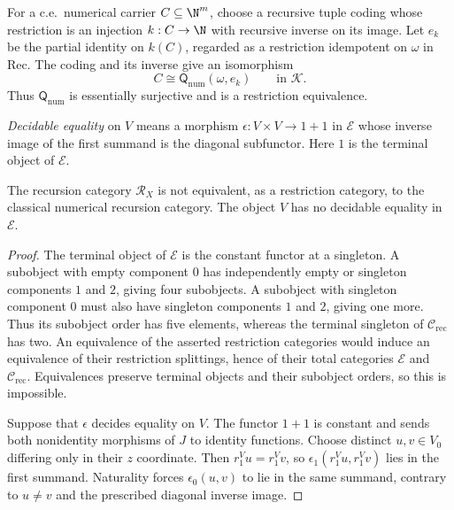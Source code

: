 For a c.e.\ numerical carrier $C\subseteq\N^m$, choose a recursive
tuple coding whose restriction is an injection $k:C\to\N$ with
recursive inverse on its image. Let $e_k$ be the partial identity
on $k(C)$, regarded as a restriction idempotent on $\omega$ in
$\mathrm{Rec}$. The coding and its inverse give an isomorphism
\[
 C\cong\mathsf Q_{\mathrm{num}}(\omega,e_k)
 \qquad\text{in }\mathcal K.
\]
Thus $\mathsf Q_{\mathrm{num}}$ is essentially surjective and is a
restriction equivalence.

\emph{Decidable equality} on $V$ means a morphism
$\epsilon:V\times V\to1+1$ in $\mathcal E$ whose inverse image of
the first summand is the diagonal subfunctor. Here $1$ is the terminal object of $\mathcal E$.

\begin{proposition}\label{prop:fork-distinction}
The recursion category $\mathscr R_X$ is not equivalent, as a
restriction category, to the classical numerical recursion category.
The object $V$ has no decidable equality in $\mathcal E$.
\end{proposition}
\begin{proof}
The terminal object of $\mathcal E$ is the constant functor at a singleton.
A subobject with empty component $0$ has independently empty or
singleton components $1$ and $2$, giving four subobjects. A
subobject with singleton component $0$ must also have singleton
components $1$ and $2$, giving one more. Thus its subobject order has five elements, whereas
the terminal singleton of $\mathcal C_{\mathrm{rec}}$ has two.
An equivalence of the asserted restriction categories would induce
an equivalence of their restriction splittings, hence of their
total categories $\mathcal E$ and $\mathcal C_{\mathrm{rec}}$.
Equivalences preserve terminal objects and their subobject orders,
so this is impossible.

Suppose that $\epsilon$ decides equality on $V$. The functor $1+1$
is constant and sends both nonidentity morphisms of $J$ to
identity functions. Choose distinct $u,v\in V_0$ differing only
in their $z$ coordinate. Then $r_1^Vu=r_1^Vv$, so
$\epsilon_1(r_1^Vu,r_1^Vv)$ lies in the first summand.
Naturality forces $\epsilon_0(u,v)$ to lie in the same summand,
contrary to $u\ne v$ and the prescribed diagonal inverse image.
\end{proof}


